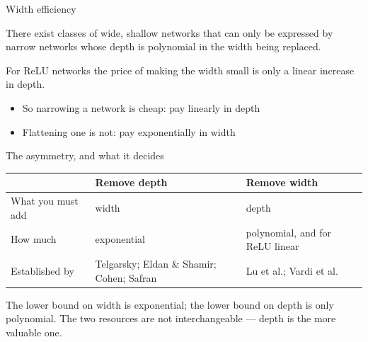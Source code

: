 \documentclass[aspectratio=169, 11pt]{beamer}
\newcommand{\src}[3]{}      %
\begin{document}
\begin{frame}{Width efficiency}
  \src{lu2017}{section}{4}
  \src{vardi2022}{section}{3}
  \src{prince2023}{page}{53}
  \vspace{0.3em}
  \begin{theorem}
    {\small There exist classes of wide, shallow networks that can only
    be expressed by narrow networks whose depth is
    \alert{polynomial} in the width being replaced.}
  \end{theorem}
  \vspace{0.4em}
  \begin{theorem}
    {\small For ReLU networks the price of making the width small is
    only a \alert{linear} increase in depth.}
  \end{theorem}
  \vspace{0.5em}
  {\small
  \begin{itemize}\setlength{\itemsep}{3pt}
    \item So narrowing a network is cheap: pay linearly in depth
    \item Flattening one is not: pay \alert{exponentially} in width
  \end{itemize}}
\end{frame}

\begin{frame}{The asymmetry, and what it decides}
  \src{prince2023}{page}{53}
  \vspace{0.05em}
  \centering
  \renewcommand{\arraystretch}{1.4}
  {\small
  \begin{tabular}{p{} p{}
                  p{}}
    & \textbf{\color{dpc}Remove depth}
    & \textbf{\color{shc}Remove width}\\
    \hline
    What you must add & width & depth\\
    How much & \alert{exponential} & \alert{polynomial}, and for ReLU
                                     \alert{linear}\\
    Established by & Telgarsky; Eldan \& Shamir; Cohen; Safran
                   & Lu et al.; Vardi et al.\\
    \hline
  \end{tabular}}
  \vspace{0.05em}
  \begin{redhighlight}
    The lower bound on width is \alert{exponential}; the lower bound on
    depth is only \alert{polynomial}. The two resources are not
    interchangeable --- \alert{depth is the more valuable one.}
  \end{redhighlight}
\end{frame}
\end{document}
